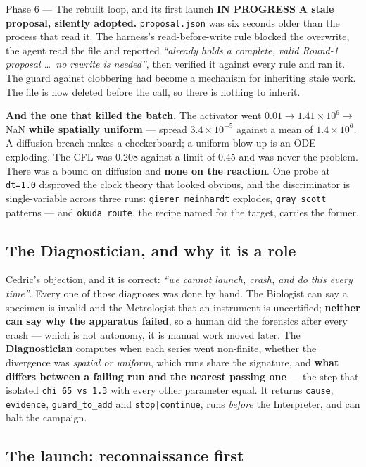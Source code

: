 \documentclass[11pt,a4paper]{article}
\newcommand{\code}[1]{\texttt{#1}}
\newcommand{\prog}{\textcolor{warn}{\textbf{IN PROGRESS}}}
\begin{document}
\begin{phasebox}{Phase 6 --- The rebuilt loop, and its first launch \hfill \prog}
\textbf{A stale proposal, silently adopted.} \code{proposal.json} was six seconds older than the
process that read it. The harness's read-before-write rule blocked the overwrite, the agent read
the file and reported \emph{``already holds a complete, valid Round-1 proposal \ldots\ no rewrite
is needed''}, then verified it against every rule and ran it. The guard against clobbering had
become a mechanism for inheriting stale work. The file is now deleted before the call, so there is
nothing to inherit.

\textbf{And the one that killed the batch.} The activator went $0.01 \to 1.41\times10^{6} \to$
NaN \textbf{while spatially uniform} --- spread $3.4\times10^{-5}$ against a mean of $1.4\times
10^{6}$. A diffusion breach makes a checkerboard; a uniform blow-up is an ODE exploding. The CFL
was 0.208 against a limit of 0.45 and was never the problem. There was a bound on diffusion and
\textbf{none on the reaction}. One probe at \code{dt=1.0} disproved the clock theory that looked
obvious, and the discriminator is single-variable across three runs: \code{gierer\_meinhardt}
explodes, \code{gray\_scott} patterns --- and \code{okuda\_route}, the recipe named for the target,
carries the former.

\subsection*{The Diagnostician, and why it is a role}

Cedric's objection, and it is correct: \emph{``we cannot launch, crash, and do this every time''}.
Every one of those diagnoses was done by hand. The Biologist can say a specimen is invalid and the
Metrologist that an instrument is uncertified; \textbf{neither can say why the apparatus failed},
so a human did the forensics after every crash --- which is not autonomy, it is manual work moved
later. The \textbf{Diagnostician} computes when each series went non-finite, whether the divergence
was \emph{spatial or uniform}, which runs share the signature, and \textbf{what differs between a
failing run and the nearest passing one} --- the step that isolated \code{chi 65 vs 1.3} with every
other parameter equal. It returns \code{cause}, \code{evidence}, \code{guard\_to\_add} and
\code{stop|continue}, runs \emph{before} the Interpreter, and can halt the campaign.

\subsection*{The launch: reconnaissance first}


\end{phasebox}
\end{document}
